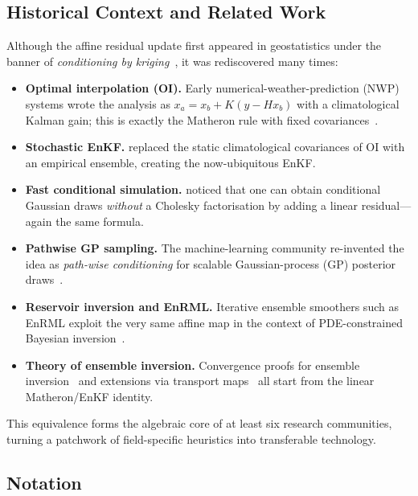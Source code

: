 \documentclass[runningheads]{llncs}
\begin{document}
\subsection{Historical Context and Related Work}\label{sec:history}

Although the affine residual update first appeared in geostatistics under the banner of \emph{conditioning by kriging}~\cite{Chiles2018Kriging}, it was rediscovered many times:
\begin{itemize}
    \item \textbf{Optimal interpolation (OI).}  Early numerical-weather-prediction (NWP) systems wrote the analysis as
    $x_a = x_b + K(y - Hx_b)$ with a climatological Kalman gain; this is exactly the Matheron rule with fixed covariances~\cite{Hunt2007LETKF}.
    \item \textbf{Stochastic EnKF.}  \cite{Evensen2003EnKF} replaced the static climatological covariances of OI with an empirical ensemble, creating the now-ubiquitous EnKF.
    \item \textbf{Fast conditional simulation.}  \cite{Doucet2010Note} noticed that one can obtain conditional Gaussian draws \emph{without} a Cholesky factorisation by adding a linear residual—again the same formula.
    \item \textbf{Pathwise GP sampling.}  The machine-learning community re-invented the idea as \emph{path-wise conditioning} for scalable Gaussian-process (GP) posterior draws~\cite{Wilson2020Efficiently,Wilson2021Pathwise,Borovitskiy2020Matern}.
    \item \textbf{Reservoir inversion and EnRML.}  Iterative ensemble smoothers such as EnRML exploit the very same affine map in the context of PDE-constrained Bayesian inversion~\cite{Chen2012EnRML}.
    \item \textbf{Theory of ensemble inversion.}  Convergence proofs for ensemble inversion~\cite{Schillings2016EnKFInverse} and extensions via transport maps~\cite{Spantini2022Coupling} all start from the linear Matheron/EnKF identity.
\end{itemize}

This equivalence forms the algebraic core of at least six research communities, turning a patchwork of field-specific heuristics into transferable technology.

\subsection{Notation}
\end{document}
